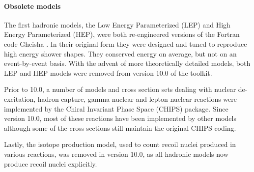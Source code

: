 \paragraph{Obsolete models}
The first \Gfour{} hadronic models, the Low Energy Parameterized (LEP) and 
High Energy Parameterized (HEP), were both re-engineered versions of the Fortran
code Gheisha \cite{hadbib:gheisha}.  In their original form they were designed
and tuned to reproduce high energy shower shapes.  They conserved energy on
average, but not on an event-by-event basis.  With the advent of more 
theoretically detailed models, both LEP and HEP models were removed from version
10.0 of the toolkit.

Prior to \Gfour{} 10.0, a number of models and cross section sets dealing
with nuclear de-excitation, hadron capture, gamma-nuclear and lepton-nuclear 
reactions were implemented by the Chiral Invariant Phase Space (CHIPS) package.
Since version 10.0, most of these reactions have been implemented by other models 
although some of the cross sections still maintain the original CHIPS coding.

Lastly, the isotope production model, used to count recoil nuclei produced in
various reactions, was removed in version 10.0, as all hadronic models now 
produce recoil nuclei explicitly.
